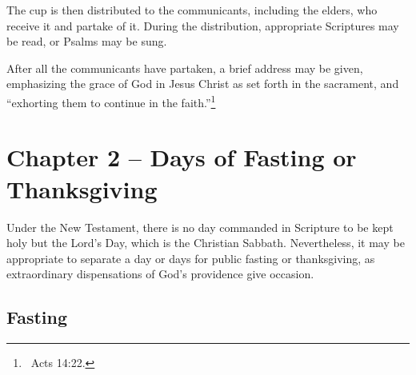 \begin{outerlst}[left=0pt,labelsep=0pt]
\begin{innerlst}[resume*]
      \item The cup is then distributed to the communicants, including the elders, who receive it and partake of it. During the distribution, appropriate Scriptures may be read, or Psalms may be sung. 
      \item After all the communicants have partaken, a brief address may be given, emphasizing the grace of God in Jesus Christ as set forth in the sacrament, and ``exhorting them to continue in the faith.''\footnote{\ Acts 14:22.} 
\end{innerlst}

\item
{}
\section{Chapter 2 -- Days of Fasting or Thanksgiving}   

\begin{innerlst}[resume*]
      \item Under the New Testament, there is no day commanded in Scripture to be kept holy but the Lord's Day, which is the Christian Sabbath. Nevertheless, it may be appropriate to separate a day or days for public fasting or thanksgiving, as extraordinary dispensations of God's providence give occasion. 
\end{innerlst} 

\subsection{Fasting}  


\end{outerlst}
